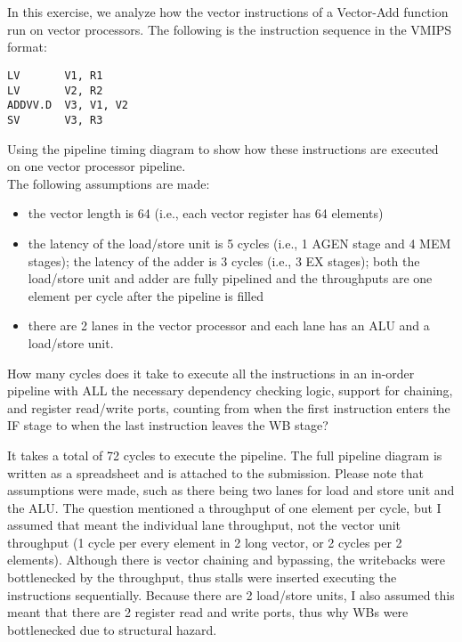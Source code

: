 \documentclass[11pt]{article}
\begin{document}
\section{}

In this exercise, we analyze how the vector instructions of a Vector-Add function run on vector processors. The following is the instruction sequence in the VMIPS format:
\begin{verbatim}
LV       V1, R1
LV       V2, R2
ADDVV.D  V3, V1, V2
SV       V3, R3
\end{verbatim}

Using the pipeline timing diagram to show how these instructions are executed on one vector processor pipeline. \\

The following assumptions are made:
\begin{itemize}
	\item the vector length is 64 (i.e., each vector register has 64 elements)
	\item the latency of the load/store unit is 5 cycles (i.e., 1 AGEN stage and 4 MEM stages); the latency of the adder is 3 cycles (i.e., 3 EX stages); both the load/store unit and adder are fully pipelined and the throughputs are one element per cycle after the pipeline is filled
	\item there are 2 lanes in the vector processor and each lane has an ALU and a load/store unit.
\end{itemize}

How many cycles does it take to execute all the instructions in an in-order pipeline with ALL the necessary dependency checking logic, support for chaining, and register read/write ports, counting from when the first instruction enters the IF stage to when the last instruction leaves the WB stage?


\begin{Answer}
	It takes a total of 72 cycles to execute the pipeline. The full pipeline diagram is written as a spreadsheet and is attached to the submission. Please note that assumptions were made, such as there being two lanes for load and store unit and the ALU. The question mentioned a throughput of one element per cycle, but I assumed that meant the individual lane throughput, not the vector unit throughput (1 cycle per every element in 2 long vector, or 2 cycles per 2 elements). Although there is vector chaining and bypassing, the writebacks were bottlenecked by the throughput, thus stalls were inserted executing the instructions sequentially. Because there are 2 load/store units, I also assumed this meant that there are 2 register read and write ports, thus why WBs were bottlenecked due to structural hazard.
\end{Answer}
\end{document}
